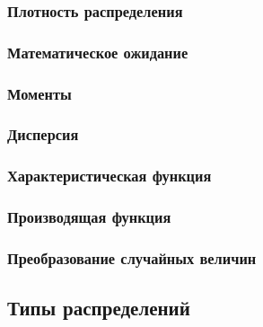 \subsubsection{Плотность распределения}
\subsubsection{Математическое ожидание}
\subsubsection{Моменты}
\subsubsection{Дисперсия}
\subsubsection{Характеристическая функция}
\subsubsection{Производящая функция}
\subsubsection{Преобразование случайных величин}

\subsection{Типы распределений}

